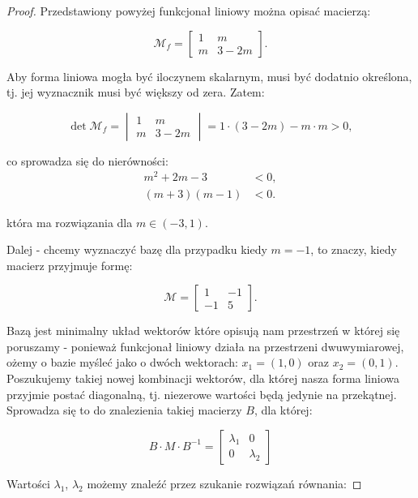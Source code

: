 \documentclass[11pt]{article}
\theoremstyle{definition}
\begin{document}
\begin{proof}
    Przedstawiony powyżej funkcjonał liniowy można opisać macierzą:

    $$\mathcal M_f = \begin{bmatrix}
            1 & m    \\
            m & 3-2m
        \end{bmatrix}.$$

    Aby forma liniowa mogła być iloczynem skalarnym, musi być dodatnio określona, tj. jej wyznacznik musi być większy od zera. Zatem:

    $$\det\mathcal M_f = \begin{vmatrix}
            1 & m    \\
            m & 3-2m
        \end{vmatrix} = 1\cdot(3-2m) - m\cdot m > 0,$$

    co sprowadza się do nierówności:
    \begin{align*}
        m^2+2m-3   & < 0, \\
        (m+3)(m-1) & < 0.
    \end{align*}

    która ma rozwiązania dla $m\in (-3, 1)$.

    Dalej - chcemy wyznaczyć bazę dla przypadku kiedy $m = -1$, to znaczy, kiedy macierz przyjmuje formę:

    $$\mathcal M = \begin{bmatrix}
            1  & -1 \\
            -1 & 5
        \end{bmatrix}.$$

    Bazą jest minimalny układ wektorów które opisują nam przestrzeń w której się poruszamy - ponieważ funkcjonał liniowy działa na przestrzeni dwuwymiarowej,
    ożemy o bazie myśleć jako o dwóch wektorach:
    $x_1 = (1,0)$ oraz $x_2=(0,1)$. Poszukujemy takiej nowej kombinacji wektorów, dla której nasza forma liniowa przyjmie postać diagonalną, tj. niezerowe wartości będą jedynie na przekątnej. Sprowadza się to do znalezienia takiej macierzy $B$, dla której:

    $$B\cdot M\cdot B^{-1} =  \begin{bmatrix}
            \lambda_1 & 0         \\
            0         & \lambda_2
        \end{bmatrix}$$

    Wartości $\lambda_1$, $\lambda_2$ możemy znaleźć przez szukanie rozwiązań równania:


\end{proof}
\end{document}
